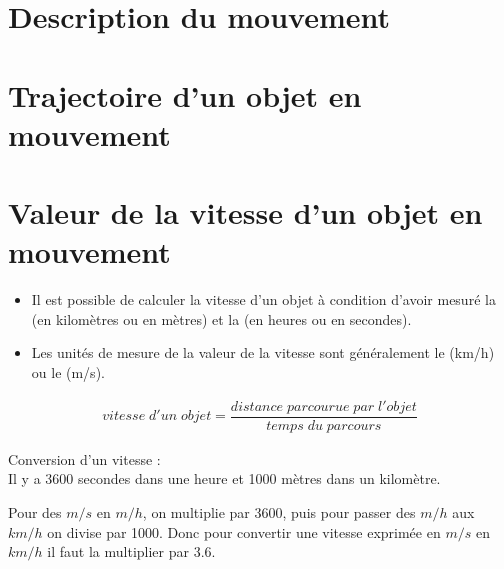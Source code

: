 \documentclass[12pt,a4paper]{article}
\date{}
\title{}
\begin{document}
	
	


\section{Description du mouvement}




\section{Trajectoire d'un objet en mouvement }





\section{Valeur de la vitesse d'un objet en mouvement}






\begin{mybilan}
\begin{itemize}
\item Il est possible de calculer la vitesse d'un objet à condition d'avoir mesuré la  (en kilomètres ou en mètres) et la  (en heures ou en secondes). 

\item Les unités de mesure de la valeur de la vitesse sont généralement le  (km/h) ou le  (m/s).
\end{itemize}



\end{mybilan}



\begin{align*}
vitesse\; d'un\; objet = \dfrac{distance \;  parcourue \; par \; l'objet}{temps \; du  \; parcours}
\end{align*}

\begin{mymeth}
	
	Conversion d'un vitesse :\\
	
	Il y a \num{3600} secondes dans une heure et \num{1000} mètres dans un kilomètre.	
	
	Pour des $m/s$ en $m/h$, on multiplie par \num{3600}, puis pour passer des $m/h$ aux $km/h$ on divise par \num{1000}.
	Donc pour convertir une vitesse exprimée en $m/s$ en $km/h$ il faut la multiplier par  $\num{3.6}$. 	
		
\end{mymeth}
\end{document}
